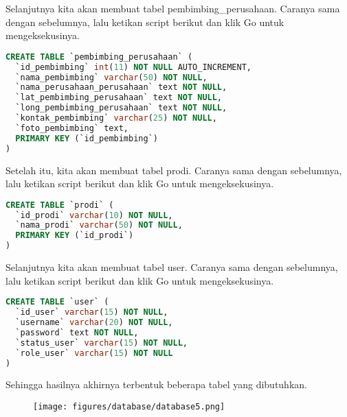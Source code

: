 \noindent
Selanjutnya kita akan membuat tabel pembimbing\_perusahaan. Caranya sama dengan sebelumnya, lalu ketikan script berikut dan klik Go untuk mengeksekusinya.

\begin{lstlisting}[language=SQL]
CREATE TABLE `pembimbing_perusahaan` (
  `id_pembimbing` int(11) NOT NULL AUTO_INCREMENT,
  `nama_pembimbing` varchar(50) NOT NULL,
  `nama_perusahaan_perusahaan` text NOT NULL,
  `lat_pembimbing_perusahaan` text NOT NULL,
  `long_pembimbing_perusahaan` text NOT NULL,
  `kontak_pembimbing` varchar(25) NOT NULL,
  `foto_pembimbing` text,
  PRIMARY KEY (`id_pembimbing`)
)
\end{lstlisting}

\noindent
Setelah itu, kita akan membuat tabel prodi. Caranya sama dengan sebelumnya, lalu ketikan script berikut dan klik Go untuk mengeksekusinya.

\begin{lstlisting}[language=SQL]
CREATE TABLE `prodi` (
  `id_prodi` varchar(10) NOT NULL,
  `nama_prodi` varchar(50) NOT NULL,
  PRIMARY KEY (`id_prodi`)
)
\end{lstlisting}

\noindent
Selanjutnya kita akan membuat tabel user. Caranya sama dengan sebelumnya, lalu ketikan script berikut dan klik Go untuk mengeksekusinya.

\begin{lstlisting}[language=SQL]
CREATE TABLE `user` (
  `id_user` varchar(15) NOT NULL,
  `username` varchar(20) NOT NULL,
  `password` text NOT NULL,
  `status_user` varchar(15) NOT NULL,
  `role_user` varchar(15) NOT NULL
)
\end{lstlisting}

\noindent
Sehingga hasilnya akhirnya terbentuk beberapa tabel yang dibutuhkan.

\begin{figure}[H]
\centering
\texttt{[image: figures/database/database5.png]}
\end{figure}